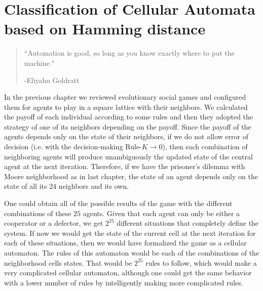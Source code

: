 \chapter{Classification of Cellular Automata based on Hamming distance}
\label{chap:HammingECA}

\renewcommand\labelenumi{(\roman{enumi})}
\renewcommand\theenumi\labelenumi


\begin{quotation}
	\vspace{-3cm}
    \begin{flushright}
    \begin{minipage}[t][5cm][b]{0.5\textwidth}
    { ``Automation is good, so long as you know exactly where to put the machine."}
    
    \bigskip
    
    -{\small  Eliyahu Goldratt}
    \end{minipage}
    \end{flushright}
    
    \vspace{0.5cm}
\end{quotation}

\vspace{0.5cm}

\let\thefootnote\relax{}

\vspace{1cm}


In the previous chapter we reviewed evolutionary social games and configured them for agents to play in a square lattice with their neighbors. We calculated the payoff of each individual according to some rules and then they adopted the strategy of one of its neighbors depending on the payoff. Since the payoff of the agents depends only on the state of their neighbors, if we do not allow error of decision (i.e. with the decision-making Rule-$K \to 0$), then each combination of neighboring agents will produce unambiguously the updated state of the central agent at the next iteration. Therefore, if we have the prisoner's dilemma with Moore neighborhood as in last chapter, the state of an agent depends only on the state of all its $24$ neighbors and its own. 

One could obtain all of the possible results of the game with the different combinations of these $25$ agents. Given that each agent can only be either a cooperator or a defector, we get $2^{25}$ different situations that completely define the system. If now we would get the state of the current cell at the next iteration for each of these situations, then we would have formalized the game as a cellular automaton. The rules of this automaton would be each of the combinations of the neighborhood cells states. That would be $2^{25}$ rules to follow, which would make a very complicated cellular automaton, although one could get the same behavior with a lower number of rules by intelligently making more complicated rules. 

